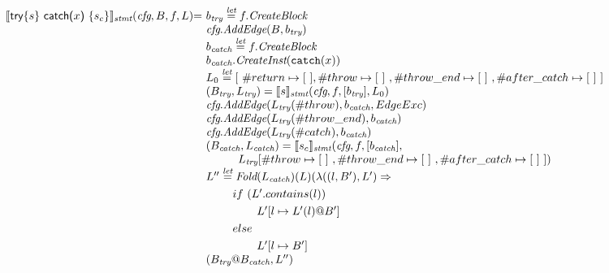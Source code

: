 \[\begin{array}{l@{}l@{~}l}
\transfun{\ircfgtrycat{s}{x}{s_c}}_{\emph{stmt}}(\emph{cfg}, B, f, L) & = &
b_{\emph{try}} \letval f.\emph{CreateBlock}\\
& & \emph{cfg}.\emph{AddEdge}(B, b_{\emph{try}})\\
& & b_{\emph{catch}} \letval f.\emph{CreateBlock}\\
& & b_{\emph{catch}}.\emph{CreateInst}(\TT{catch}(x))\\
& & L_0 \letval [\ \#return \mapsto [\ ], \#throw \mapsto [\ ]\ , \#throw\_end \mapsto [\ ]\ ,\#after\_catch \mapsto [\ ]\ ] \\
& & (B_{\emph{try}},L_{\emph{try}}) = \transfun{s}_{\emph{stmt}}(\emph{cfg}, f, [b_{\emph{try}}], L_0)\\
& & \emph{cfg}.\emph{AddEdge}(L_{\emph{try}}(\#throw), b_{\emph{catch}}, EdgeExc)\\
& & \emph{cfg}.\emph{AddEdge}(L_{\emph{try}}(\#throw\_end), b_{\emph{catch}})\\
& & \emph{cfg}.\emph{AddEdge}(L_{\emph{try}}(\#catch), b_{\emph{catch}})\\
& & (B_{\emph{catch}}, L_{\emph{catch}}) = \transfun{s_c}_{\emph{stmt}}(\emph{cfg}, f, [b_{\emph{catch}}],\\
& & \phantom{ififif} L_{\emph{try}}[\#throw \mapsto [\ ]\ ,\#throw\_end \mapsto [\ ]\ , \#after\_catch \mapsto [\ ]\ ])\\
& & L'' \letval \Fold(L_{\emph{catch}})(L)(\lambda((l, B'), L') \Rightarrow\\
& & \phantom{L'' \letval} if\ (L'.contains(l))\\
& & \phantom{L'' \letval \Fold} L'[l \mapsto L'(l)@B']\\
& & \phantom{L'' \letval} else\\
& & \phantom{L'' \letval \Fold} L'[l \mapsto B']\\
& & (B_{\emph{try}}@B_{\emph{catch}}, L'')\\
\end{array}
\]


